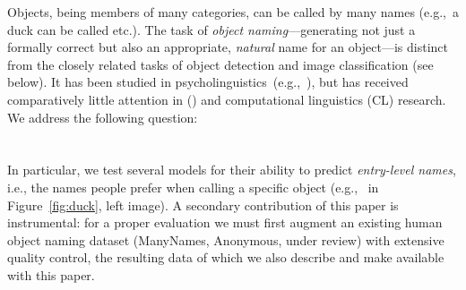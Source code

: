 Objects, being members of many categories, can be called by many names (e.g.,\ a duck can be called  etc.). 
The task of \emph{object naming}---generating not just a formally correct but also an appropriate, \emph{natural} name for an object---is distinct from the closely related tasks of object detection and image classification (see below).
It has been studied in psycholinguistics~(e.g.,~\citet{Rosch1978}), but has received comparatively little attention in \langvis (\lv) and computational linguistics (CL) research.
We address the following question:\\
\\\\
In particular, we test several models for their ability to predict \emph{entry-level names}, i.e., the names people prefer when calling a specific object (e.g.,~ in Figure~\ref{fig:duck}, left image).
A secondary contribution of this paper is instrumental: for a proper evaluation we must first augment an existing human object naming dataset (ManyNames, Anonymous, under review) with extensive quality control, the resulting data of which we also describe and make available with this paper.
